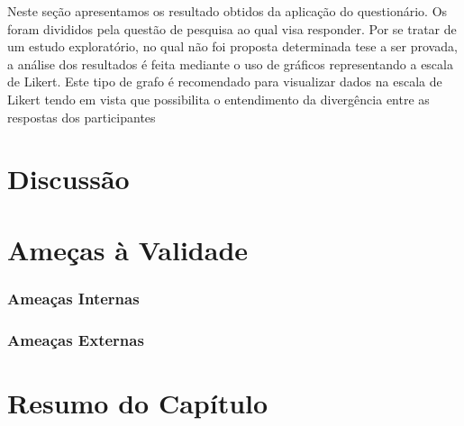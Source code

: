 Neste seção apresentamos os resultado obtidos da aplicação do questionário. Os foram divididos pela
questão de pesquisa ao qual visa responder. Por se tratar de um estudo exploratório, no qual não foi
proposta determinada tese a ser provada, a análise dos resultados é feita mediante o uso de gráficos
representando a escala de Likert. Este tipo de grafo é recomendado para visualizar dados na escala
de Likert tendo em vista que possibilita o entendimento da divergência entre as respostas dos
participantes~\cite{robbins2011plotting}

\section{Discussão}

\section{Ameças à Validade}


\subsubsection{Ameaças Internas}
\label{ssub:Ameacas_internas}

\subsubsection{Ameaças Externas}
\label{ssub:Ameacas_externas}


\section{Resumo do Capítulo}
\label{sec:resumo_do_capitulo}
